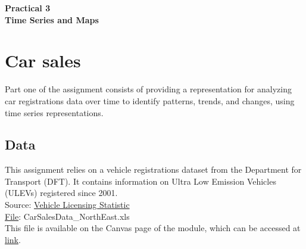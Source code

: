 \documentclass[11pt]{article}
\begin{document}
\pagestyle{fancy}
\renewcommand{\headrulewidth}{0pt}

\begin{center}
\vspace*{1cm}
{\textbf {\Huge Practical 3}}\\
\vspace*{0.5cm}
{\textbf {\huge Time Series and Maps}}
\vspace*{1cm}
\end{center}

\section{Car sales}

Part one of the assignment consists of providing a representation for analyzing car registrations data over time to identify patterns, trends, and changes, using time series representations.

\subsection*{Data}

This assignment relies on a vehicle registrations dataset from the Department for Transport (DFT). It contains information on Ultra Low Emission Vehicles (ULEVs) registered since 2001.\\
Source: \href{https://www.gov.uk/government/collections/vehicles-statistics}{Vehicle Licensing Statistic}\\

\underline{File}: CarSalesData\_NorthEast.xls\\
This file is available on the Canvas page of the module, which can be accessed at \href{https://ncl.instructure.com/courses/49730}{link}.\\
\end{document}
